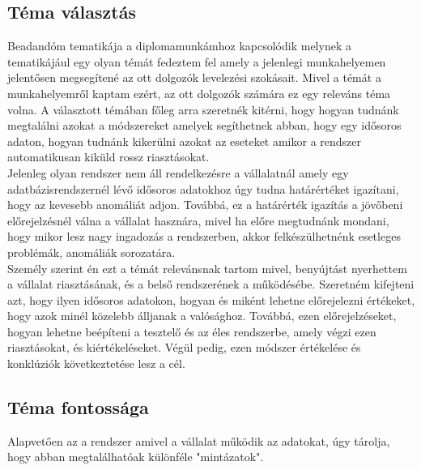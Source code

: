 
\subsection{Téma választás}
Beadandóm tematikája a diplomamunkámhoz kapcsolódik melynek a tematikájául egy olyan témát fedeztem fel amely a jelenlegi munkahelyemen jelentősen megsegítené az ott dolgozók levelezési szokásait. Mivel a témát a munkahelyemről kaptam ezért, az ott dolgozók számára ez egy releváns téma volna.
A választott témában főleg arra szeretnék kitérni, hogy hogyan tudnánk megtalálni azokat a módszereket amelyek segíthetnek abban, hogy egy idősoros adaton, hogyan tudnánk kikerülni azokat az eseteket amikor a rendszer automatikusan kiküld rossz riasztásokat.
\\
Jelenleg olyan rendszer nem áll rendelkezésre a vállalatnál amely egy adatbázisrendszernél lévő idősoros adatokhoz úgy tudna határértéket igazítani, hogy az kevesebb anomáliát adjon. Továbbá, ez a határérték igazítás a jövőbeni előrejelzésnél válna a vállalat hasznára, mivel ha előre megtudnánk mondani, hogy mikor lesz nagy ingadozás a rendszerben, akkor felkészülhetnénk esetleges problémák, anomáliák sorozatára.
\\
Személy szerint én ezt a témát relevánsnak tartom mivel, benyújtást nyerhettem a vállalat riasztásának, és a belső rendszerének a működésébe.
Szeretném kifejteni azt, hogy ilyen idősoros adatokon, hogyan és miként lehetne előrejelezni értékeket, hogy azok minél közelebb álljanak a valósághoz. Továbbá, ezen előrejelzéseket, hogyan lehetne beépíteni a tesztelő és az éles rendszerbe, amely végzi ezen riasztásokat, és kiértékeléseket. Végül pedig, ezen módszer értékelése és konklúziók következtetése lesz a cél.

\subsection{Téma fontossága}
Alapvetően az a rendszer amivel a vállalat működik az adatokat, úgy tárolja, hogy abban megtalálhatóak különféle "mintázatok".

